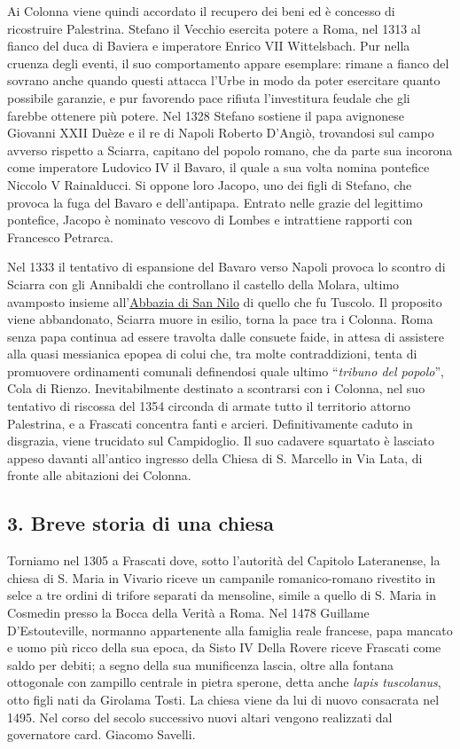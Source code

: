 \documentclass[
  letterpaper,
  DIV=11,
  numbers=noendperiod]{scrartcl}
\begin{document}
Ai Colonna viene quindi accordato il recupero dei beni ed è concesso di
ricostruire Palestrina. Stefano il Vecchio esercita potere a Roma, nel
1313 al fianco del duca di Baviera e imperatore Enrico VII Wittelsbach.
Pur nella cruenza degli eventi, il suo comportamento appare esemplare:
rimane a fianco del sovrano anche quando questi attacca l'Urbe in modo
da poter esercitare quanto possibile garanzie, e pur favorendo pace
rifiuta l'investitura feudale che gli farebbe ottenere più potere. Nel
1328 Stefano sostiene il papa avignonese Giovanni XXII Duèze e il re di
Napoli Roberto D'Angiò, trovandosi sul campo avverso rispetto a Sciarra,
capitano del popolo romano, che da parte sua incorona come imperatore
Ludovico IV il Bavaro, il quale a sua volta nomina pontefice Niccolo V
Rainalducci. Si oppone loro Jacopo, uno dei figli di Stefano, che
provoca la fuga del Bavaro e dell'antipapa. Entrato nelle grazie del
legittimo pontefice, Jacopo è nominato vescovo di Lombes e intrattiene
rapporti con Francesco Petrarca.

Nel 1333 il tentativo di espansione del Bavaro verso Napoli provoca lo
scontro di Sciarra con gli Annibaldi che controllano il castello della
Molara, ultimo avamposto insieme
all'\href{2016-12-31-momenti-fine-comandini.html\#parus\%C3\%ACa-unica-via}{Abbazia
di San Nilo} di quello che fu Tuscolo. Il proposito viene abbandonato,
Sciarra muore in esilio, torna la pace tra i Colonna. Roma senza papa
continua ad essere travolta dalle consuete faide, in attesa di assistere
alla quasi messianica epopea di colui che, tra molte contraddizioni,
tenta di promuovere ordinamenti comunali definendosi quale ultimo
``\emph{tribuno del popolo}'', Cola di Rienzo. Inevitabilmente destinato
a scontrarsi con i Colonna, nel suo tentativo di riscossa del 1354
circonda di armate tutto il territorio attorno Palestrina, e a Frascati
concentra fanti e arcieri. Definitivamente caduto in disgrazia, viene
trucidato sul Campidoglio. Il suo cadavere squartato è lasciato appeso
davanti all'antico ingresso della Chiesa di S. Marcello in Via Lata, di
fronte alle abitazioni dei Colonna.

\hypertarget{breve-storia-di-una-chiesa}{%
\subsection{3. Breve storia di una
chiesa}\label{breve-storia-di-una-chiesa}}

Torniamo nel 1305 a Frascati dove, sotto l'autorità del Capitolo
Lateranense, la chiesa di S. Maria in Vivario riceve un campanile
romanico-romano rivestito in selce a tre ordini di trifore separati da
mensoline, simile a quello di S. Maria in Cosmedin presso la Bocca della
Verità a Roma. Nel 1478 Guillame D'Estouteville, normanno appartenente
alla famiglia reale francese, papa mancato e uomo più ricco della sua
epoca, da Sisto IV Della Rovere riceve Frascati come saldo per debiti; a
segno della sua munificenza lascia, oltre alla fontana ottogonale con
zampillo centrale in pietra sperone, detta anche \emph{lapis
tuscolanus}, otto figli nati da Girolama Tosti. La chiesa viene da lui
di nuovo consacrata nel 1495. Nel corso del secolo successivo nuovi
altari vengono realizzati dal governatore card. Giacomo Savelli.
\end{document}

